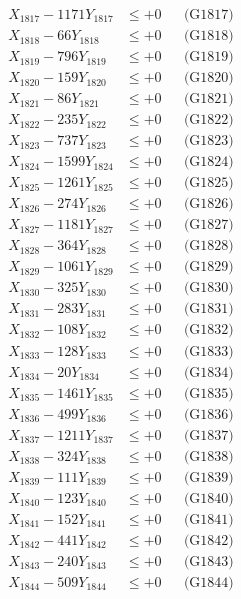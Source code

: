 \documentclass[a4paper,10pt]{article}
\begin{document}
{\begin{align}
X_{1817} - 1171Y_{1817} &\leq +0 && \text{(G1817)} \\
X_{1818} - 66Y_{1818} &\leq +0 && \text{(G1818)} \\
X_{1819} - 796Y_{1819} &\leq +0 && \text{(G1819)} \\
X_{1820} - 159Y_{1820} &\leq +0 && \text{(G1820)} \\
\allowbreak
X_{1821} - 86Y_{1821} &\leq +0 && \text{(G1821)} \\
X_{1822} - 235Y_{1822} &\leq +0 && \text{(G1822)} \\
X_{1823} - 737Y_{1823} &\leq +0 && \text{(G1823)} \\
X_{1824} - 1599Y_{1824} &\leq +0 && \text{(G1824)} \\
X_{1825} - 1261Y_{1825} &\leq +0 && \text{(G1825)} \\
X_{1826} - 274Y_{1826} &\leq +0 && \text{(G1826)} \\
X_{1827} - 1181Y_{1827} &\leq +0 && \text{(G1827)} \\
X_{1828} - 364Y_{1828} &\leq +0 && \text{(G1828)} \\
X_{1829} - 1061Y_{1829} &\leq +0 && \text{(G1829)} \\
X_{1830} - 325Y_{1830} &\leq +0 && \text{(G1830)} \\
\allowbreak
X_{1831} - 283Y_{1831} &\leq +0 && \text{(G1831)} \\
X_{1832} - 108Y_{1832} &\leq +0 && \text{(G1832)} \\
X_{1833} - 128Y_{1833} &\leq +0 && \text{(G1833)} \\
X_{1834} - 20Y_{1834} &\leq +0 && \text{(G1834)} \\
X_{1835} - 1461Y_{1835} &\leq +0 && \text{(G1835)} \\
X_{1836} - 499Y_{1836} &\leq +0 && \text{(G1836)} \\
X_{1837} - 1211Y_{1837} &\leq +0 && \text{(G1837)} \\
X_{1838} - 324Y_{1838} &\leq +0 && \text{(G1838)} \\
X_{1839} - 111Y_{1839} &\leq +0 && \text{(G1839)} \\
X_{1840} - 123Y_{1840} &\leq +0 && \text{(G1840)} \\
\allowbreak
X_{1841} - 152Y_{1841} &\leq +0 && \text{(G1841)} \\
X_{1842} - 441Y_{1842} &\leq +0 && \text{(G1842)} \\
X_{1843} - 240Y_{1843} &\leq +0 && \text{(G1843)} \\
X_{1844} - 509Y_{1844} &\leq +0 && \text{(G1844)} \\

\end{align}}
\end{document}
